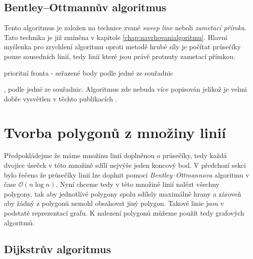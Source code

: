 \subsection{Bentley–Ottmannův algoritmus}
Tento algoritmus je založen na technice zvané \textit{sweep line} neboli \textit{zametací přímka}. Tato technika je již zmíněna v kapitole \ref{chap:navrhovanialgoritmu}. Hlavní myšlenka pro zrychlení algoritmu oproti metodě hrubé síly je počítat průsečíky pouze sousedních linií, tedy linií které jsou právě protnuty zametací přímkou.

prioritní fronta - seřazené body podle jedné ze souřadnic





, podle jedné ze souřadnic. Algoritmus zde nebuda více popisován jelikož je velmi dobře vysvětlen v těchto publikacích \cite{bentley1979algorithms} \cite{bayer2008algoritmy}.





\section{Tvorba polygonů z množiny linií}
Předpokládejme že máme množinu linií doplněnou o průsečíky, tedy každá dvojice úseček v této množině sdílí nejvýše jeden koncový bod. V předchozí sekci bylo řečeno že průsečíky linií lze doplnit pomocí \textit{Bentley–Ottmannova} algoritmu v čase $\mathcal{O}(n\log{}n)$. Nyní chceme tedy v této množině linií nalézt všechny polygony, tak aby jednotlivé polygony spolu sdílely maximálně hrany a zároveň aby žádný z polygonů nemohl obsahovat jiný polygon. Takové linie jsou v podstatě reprezentací grafu. K nalezení polygonů můžeme použít tedy grafových algoritmů. 
	
\subsection{Dijkstrův algoritmus}

